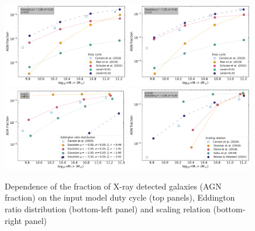 \begin{figure}
\begin{center}
  \includegraphics[width=0.49\textwidth]{Figs/Chapter3/AGN_fractions_vs_U_mean-2.00_sigma0.3_z0.45.pdf}
  \includegraphics[width=0.49\textwidth]{Figs/Chapter3/AGN_fractions_vs_U_mean-1.50_sigma0.3_z1.0.pdf}
  \includegraphics[width=0.49\textwidth]{Figs/Chapter3/AGN_fractions_EddRatio_U=0.2_z0.45.pdf}
  \includegraphics[width=0.49\textwidth]{Figs/Chapter3/AGN_fractions_ScalRel_comparison_z0.45.pdf}
  \caption{Dependence of the fraction of X-ray detected galaxies (AGN fraction) on the input model duty cycle (top panels),
  Eddington ratio distribution (bottom-left panel) and scaling relation (bottom-right panel)}
    \label{fig:AGN_fractions}
\end{center}
\end{figure}

